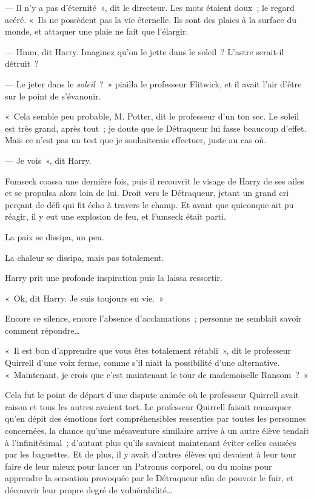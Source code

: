 --- Il n'y a pas d'éternité~», dit le directeur. Les mots étaient doux~; le regard acéré. «~Ils ne possèdent pas la vie éternelle. Ils sont des plaies à la surface du monde, et attaquer une plaie ne fait que l'élargir.

--- Hmm, dit Harry. Imaginez qu'on le jette dans le soleil~? L'astre serait-il détruit~?

--- Le jeter dans le \emph{soleil}~?~» piailla le professeur Flitwick, et il avait l'air d'être sur le point de s'évanouir.

«~Cela semble peu probable, M. Potter, dit le professeur d'un ton sec. Le soleil est très grand, après tout~; je doute que le Détraqueur lui fasse beaucoup d'effet. Mais ce n'est pas un test que je souhaiterais effectuer, juste au cas où.

--- Je vois~», dit Harry.

Fumseck coassa une dernière fois, puis il recouvrit le visage de Harry de ses ailes et se propulsa alors loin de lui. Droit vers le Détraqueur, jetant un grand cri perçant de défi qui fit écho à travers le champ. Et avant que quiconque ait pu réagir, il y eut une explosion de feu, et Fumseck était parti.

La paix se dissipa, un peu.

La chaleur se dissipa, mais pas totalement.

Harry prit une profonde inspiration puis la laissa ressortir.

«~Ok, dit Harry. Je suis toujours en vie.~»

Encore ce silence, encore l'absence d'acclamations~; personne ne semblait savoir comment répondre…

«~Il est bon d'apprendre que vous êtes totalement rétabli~», dit le professeur Quirrell d'une voix ferme, comme s'il niait la possibilité d'une alternative. «~Maintenant, je crois que c'est maintenant le tour de mademoiselle Ransom~?~»

Cela fut le point de départ d'une dispute animée où le professeur Quirrell avait raison et tous les autres avaient tort. Le professeur Quirrell faisait remarquer qu'en dépit des émotions fort compréhensibles ressenties par toutes les personnes concernées, la chance qu'une mésaventure similaire arrive à un autre élève tendait à l'infinitésimal~; d'autant plus qu'ils savaient maintenant éviter celles causées par les baguettes. Et de plus, il y avait d'autres élèves qui devaient à leur tour faire de leur mieux pour lancer un Patronus corporel, ou du moins pour apprendre la sensation provoquée par le Détraqueur afin de pouvoir le fuir, et découvrir leur propre degré de vulnérabilité…


